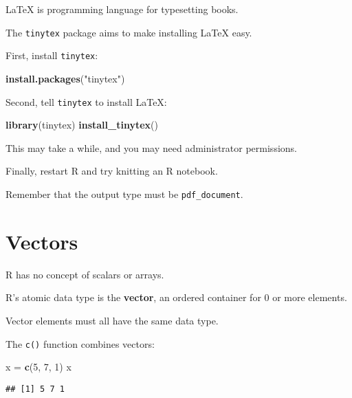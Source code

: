 \documentclass[
]{article}
\newenvironment{Shaded}{\begin{snugshade}}{\end{snugshade}}
\newcommand{\DecValTok}[1]{\textcolor[rgb]{0.00,0.00,0.81}{#1}}
\newcommand{\KeywordTok}[1]{\textcolor[rgb]{0.13,0.29,0.53}{\textbf{#1}}}
\newcommand{\NormalTok}[1]{#1}
\newcommand{\StringTok}[1]{\textcolor[rgb]{0.31,0.60,0.02}{#1}}
\begin{document}
LaTeX is programming language for typesetting books.

The \texttt{tinytex} package aims to make installing LaTeX easy.

First, install \texttt{tinytex}:

\begin{Shaded}
\begin{Highlighting}[]
\KeywordTok{install.packages}\NormalTok{(}\StringTok{"tinytex"}\NormalTok{)}
\end{Highlighting}
\end{Shaded}

Second, tell \texttt{tinytex} to install LaTeX:

\begin{Shaded}
\begin{Highlighting}[]
\KeywordTok{library}\NormalTok{(tinytex)}
\KeywordTok{install\_tinytex}\NormalTok{()}
\end{Highlighting}
\end{Shaded}

This may take a while, and you may need administrator permissions.

Finally, restart R and try knitting an R notebook.

Remember that the output type must be \texttt{pdf\_document}.

\hypertarget{vectors}{%
\section{Vectors}\label{vectors}}

R has no concept of scalars or arrays.

R's atomic data type is the \textbf{vector}, an ordered container for 0
or more elements.

Vector elements must all have the same data type.

The \texttt{c()} function combines vectors:

\begin{Shaded}
\begin{Highlighting}[]
\NormalTok{x =}\StringTok{ }\KeywordTok{c}\NormalTok{(}\DecValTok{5}\NormalTok{, }\DecValTok{7}\NormalTok{, }\DecValTok{1}\NormalTok{)}
\NormalTok{x}
\end{Highlighting}
\end{Shaded}

\begin{verbatim}
## [1] 5 7 1
\end{verbatim}
\end{document}
